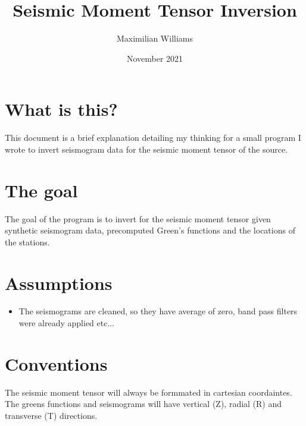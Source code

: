 \documentclass{article}
\title{Seismic Moment Tensor Inversion}
\author{Maximilian Williams}
\date{November 2021}
\begin{document}
\maketitle


\section*{What is this?}
This document is a brief explanation detailing my thinking for a small program I wrote to invert seismogram data for the seismic moment tensor of the source.

\section*{The goal}
The goal of the program is to invert for the seismic moment tensor given synthetic seismogram data, precomputed Green's functions and the locations of the stations. 

\section*{Assumptions}

\begin{itemize}
  \item The seismograms are cleaned, so they have average of zero, band pass filters were already applied etc...
\end{itemize}


\section*{Conventions}
The seismic moment tensor will always be formmated in cartesian coordaintes. 
\newline
The greens functions and seismograms will have vertical (Z), radial (R) and transverse (T) directions.
\end{document}

